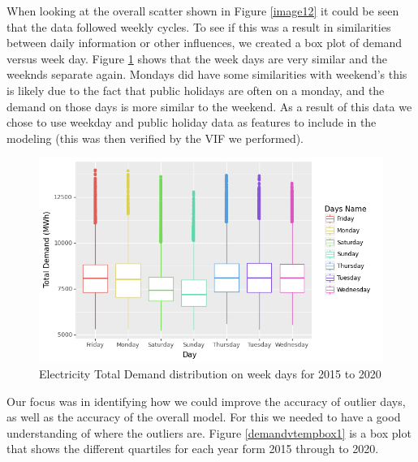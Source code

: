 \documentclass[mstat,12pt]{unswthesis}
\begin{document}
When looking at the overall scatter shown in Figure \ref{image12} it
could be seen that the data followed weekly cycles. To see if this was a
result in similarities between daily information or other influences, we
created a box plot of demand versus week day. Figure \ref{weekly} shows
that the week days are very similar and the weeknds separate again.
Mondays did have some similarities with weekend's this is likely due to
the fact that public holidays are often on a monday, and the demand on
those days is more similar to the weekend. As a result of this data we
chose to use weekday and public holiday data as features to include in
the modeling (this was then verified by the VIF we performed).

\begin{figure}[H]
\includegraphics[width=140mm]{Electricity Total Demand distribution on week days for 2015 to 2020.png}
\caption{Electricity Total Demand distribution on week days for 2015 to 2020}
\label{weekly}
\end{figure}

Our focus was in identifying how we could improve the accuracy of
outlier days, as well as the accuracy of the overall model. For this we
needed to have a good understanding of where the outliers are. Figure
\ref{demandvtempbox1} is a box plot that shows the different quartiles
for each year form 2015 through to 2020.
\end{document}
